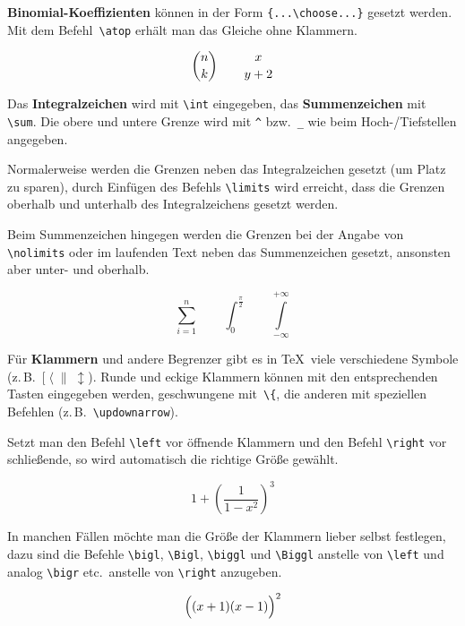 \textbf{Binomial-Koeffizienten} können in der Form
\lstinline|{...\choose...}| gesetzt werden.
Mit dem Befehl~\lstinline|\atop| erhält man das Gleiche ohne
Klammern.

\begin{LTXexample}
\[
{ n \choose k } \qquad
{ x\atop y+2 }
\]
\end{LTXexample}


\medskip

Das \textbf{Integralzeichen} wird mit \lstinline|\int| eingegeben, das
\textbf{Summenzeichen} mit \lstinline|\sum|.
Die obere und untere Grenze wird mit \lstinline|^| bzw.~\lstinline|_| wie
beim \mbox{Hoch-}\slash Tiefstellen angegeben.
 
Normalerweise werden die Grenzen neben das Integralzeichen
gesetzt (um Platz zu sparen), durch Einfügen des Befehls
\lstinline|\limits| wird erreicht, dass die Grenzen oberhalb und
unterhalb des Integralzeichens gesetzt werden.
 
Beim Summenzeichen hingegen werden die Grenzen bei der Angabe von
\lstinline|\nolimits| oder im laufenden Text neben das Summenzeichen
gesetzt, ansonsten aber unter- und oberhalb.

\begin{LTXexample}
\[
\sum_{i=1}^{n} \qquad
\int_{0}^{\frac{\pi}{2}} \qquad
\int \limits_{-\infty}^{+\infty}
\]
\end{LTXexample}
 
Für \textbf{Klammern} und andere Begrenzer gibt es in \TeX\ 
viele verschiedene Symbole
(z.\,B.~\([\;\langle\;\|\;\updownarrow\)).
Runde und eckige Klammern können mit den entsprechenden Tasten
eingegeben werden, geschwungene mit~\lstinline|\{|, die anderen mit
speziellen Befehlen (z.\,B.~\lstinline|\updownarrow|).
 
Setzt man den Befehl \lstinline|\left| vor öffnende Klammern und den
Befehl \lstinline|\right| vor schließende, so wird automatisch die
richtige Größe gewählt.

\begin{LTXexample}
\[
1 + \left( \frac{1}{ 1-x^{2} }
    \right) ^3
\]
\end{LTXexample}

 
In manchen Fällen möchte man die Größe der Klammern lieber
selbst festlegen, dazu sind die Befehle
\lstinline|\bigl|,
\lstinline|\Bigl|,
\lstinline|\biggl| und
\lstinline|\Biggl| anstelle von \lstinline|\left|
und analog \lstinline|\bigr| etc.\ anstelle von \lstinline|\right|
anzugeben.

\begin{LTXexample}
\[
\Bigl( (x+1) (x-1) \Bigr) ^{2}
\]
\end{LTXexample}
 
